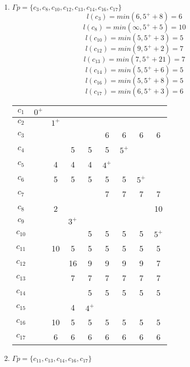 \documentclass[12pt, a4paper] {ncc}
\begin{document}
\begin{enumerate}
    \item $\Gamma p = \{ c_3, c_8, c_{10}, c_{12}, c_{13}, c_{14}, c_{16}, c_{17}\}$
        $$l(c_3) = min(6, 5^+ + 8) = 6$$
        $$l(c_8) = min(\infty, 5^+ + 5) = 10$$
        $$l(c_{10}) = min(5, 5^+ + 3) = 5$$
        $$l(c_{12}) = min(9, 5^+ + 2) = 7$$
        $$l(c_{13}) = min(7, 5^+ + 21) = 7$$
        $$l(c_{14}) = min(5, 5^+ + 6) = 5$$
        $$l(c_{16}) = min(5, 5^+ + 8) = 5$$
        $$l(c_{17}) = min(6, 5^+ + 3) = 6$$
\begin{tabular} {|c|c|c|c|c|c|c|c|c|}
    \hline
    $c_{1}$  &$0^+$&      &     &     &     &     &     &         \\ \hline
    $c_{2}$  & \z  &$1^+$ &     &     &     &     &     &   	 \\ \hline
    $c_{3}$  & \z  & \z   & \z  &\z   & 6   &  6  &  6  &  6	 \\ \hline
    $c_{4}$  & \z  & \z   & 5   & 5   & 5   &$5^+$&     &   	   \\ \hline
    $c_{5}$  & \z  & 4    & 4   & 4   &$4^+$&     &     &   	    \\ \hline
    $c_{6}$  & \z  & 5    & 5   & 5   & 5   &  5  &$5^+$&   	    \\ \hline
    $c_{7}$  & \z  & \z   & \z  & \z  & 7   &  7  &  7  &  7	 \\ \hline
    $c_{8}$  & \z  & 2    & \z  & \z  & \z  &  \z & \z  &  10	 \\ \hline
    $c_{9}$  & \z  & \z   &$3^+$&     &     &     &     &   	 \\ \hline
    $c_{10}$ & \z  & \z   & \z  & 5   & 5   &  5  &  5  &$5^+$	 \\ \hline
    $c_{11}$ & \z  & 10   &  5  & 5   & 5   &  5  &  5  &  5	 \\ \hline
    $c_{12}$ & \z  & \z   & 16  & 9   & 9   &  9  &  9  &  7	 \\ \hline
    $c_{13}$ & \z  & \z   & 7   & 7   & 7   &  7  &  7  &  7	 \\ \hline
    $c_{14}$ & \z  & \z   & \z  & 5   & 5   &  5  &  5  &  5	 \\ \hline
    $c_{15}$ & \z  & \z   & 4   &$4^+$&     &     &     &   	 \\ \hline
    $c_{16}$ & \z  & 10   & 5   & 5   & 5   &  5  &  5  &  5	 \\ \hline
    $c_{17}$ & \z  & 6    & 6   & 6   & 6   &  6  &  6  &  6	 \\ \hline 
\end{tabular}
	\item $\Gamma p = \{ c_{11}, c_{13}, c_{14}, c_{16}, c_{17}\}$

\end{enumerate}
\end{document}
